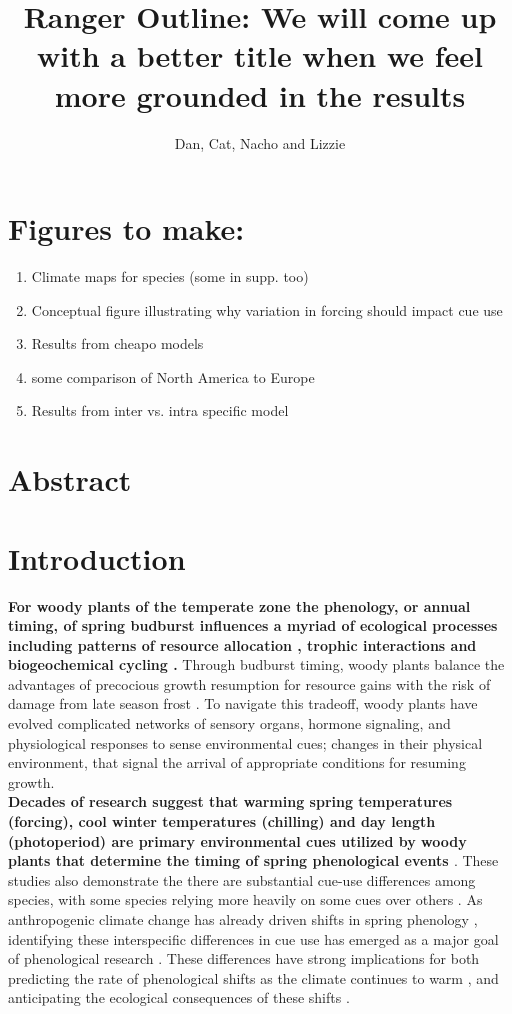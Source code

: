 \documentclass[11pt]{article}\usepackage[]{graphicx}\usepackage[]{color}
\title{Ranger Outline: We will come up with a better title when we feel more grounded in the results}
\date{}
\author{Dan, Cat, Nacho and Lizzie}
\begin{document}
\maketitle
\section*{Figures to make:}
\begin{enumerate}
\item Climate maps for species (some in supp. too)
\item Conceptual figure illustrating why variation in forcing should impact cue use
\item Results from cheapo models
\item some comparison of North America to Europe
\item Results from inter vs. intra specific model

\end{enumerate}
\section*{Abstract}
\section*{Introduction}
\textbf{For woody plants of the temperate zone the phenology, or annual timing, of spring budburst influences a myriad of ecological processes including patterns of resource allocation \citep{}, trophic interactions \citep{} and biogeochemical cycling \citep{}.}
 Through budburst timing, woody plants balance the advantages of precocious growth resumption for resource gains with the risk of damage from late season frost \citep{}. To navigate this tradeoff, woody plants have evolved complicated networks of sensory organs, hormone signaling, and physiological responses to sense environmental cues; changes in their physical environment, that signal the arrival of appropriate conditions for resuming growth.\\

\textbf{Decades of research suggest that warming spring temperatures (forcing), cool winter temperatures (chilling) and day length (photoperiod) are primary environmental cues utilized by woody plants that determine the timing of spring phenological events \cite{}}. These studies also demonstrate the there are substantial cue-use differences among species, with some species relying more heavily on some cues over others \citep{Laube:2014aa}. As anthropogenic climate change has already driven shifts in spring phenology \citep{}, identifying these interspecific differences in cue use has emerged as a major goal of phenological research \citep{}. These differences have strong implications for both predicting the rate of phenological shifts as the climate continues to warm \citep{}, and anticipating the ecological consequences of these shifts \citep{}.
\end{document}
